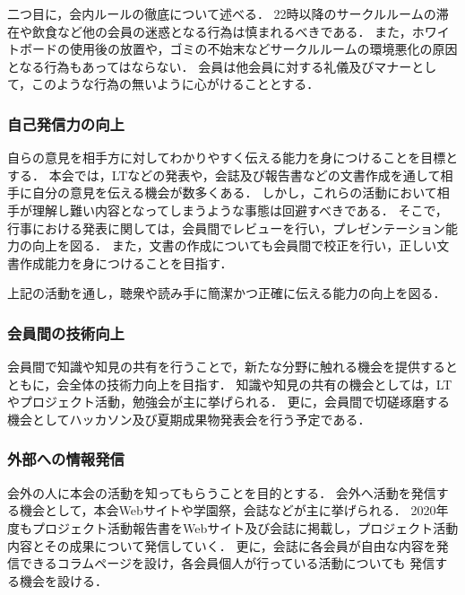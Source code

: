   二つ目に，会内ルールの徹底について述べる．
  22時以降のサークルルームの滞在や飲食など他の会員の迷惑となる行為は慎まれるべきである．
  また，ホワイトボードの使用後の放置や，ゴミの不始末などサークルルームの環境悪化の原因となる行為もあってはならない．
  会員は他会員に対する礼儀及びマナーとして，このような行為の無いように心がけることとする．
  
\subsubsection*{自己発信力の向上}
  自らの意見を相手方に対してわかりやすく伝える能力を身につけることを目標とする．
  本会では，LTなどの発表や，会誌及び報告書などの文書作成を通して相手に自分の意見を伝える機会が数多くある．
  しかし，これらの活動において相手が理解し難い内容となってしまうような事態は回避すべきである．
  そこで，行事における発表に関しては，会員間でレビューを行い，プレゼンテーション能力の向上を図る．
  また，文書の作成についても会員間で校正を行い，正しい文書作成能力を身につけることを目指す．

  上記の活動を通し，聴衆や読み手に簡潔かつ正確に伝える能力の向上を図る．

\subsubsection*{会員間の技術向上}
  会員間で知識や知見の共有を行うことで，新たな分野に触れる機会を提供するとともに，会全体の技術力向上を目指す．
  知識や知見の共有の機会としては，LTやプロジェクト活動，勉強会が主に挙げられる．
  更に，会員間で切磋琢磨する機会としてハッカソン及び夏期成果物発表会を行う予定である．

\subsubsection*{外部への情報発信}
  会外の人に本会の活動を知ってもらうことを目的とする．
  会外へ活動を発信する機会として，本会Webサイトや学園祭，会誌などが主に挙げられる．
  2020年度もプロジェクト活動報告書をWebサイト及び会誌に掲載し，プロジェクト活動内容とその成果について発信していく．
  更に，会誌に各会員が自由な内容を発信できるコラムページを設け，各会員個人が行っている活動についても
  発信する機会を設ける．

